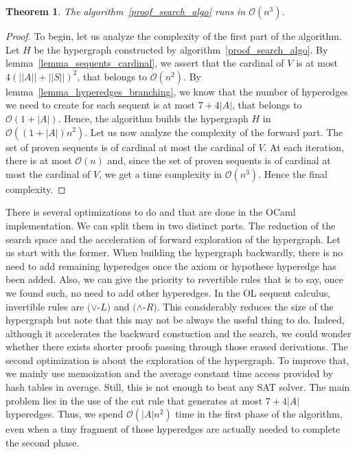 \documentclass[a4paper, 11pt]{article}
\newtheorem{theorem}{Theorem}
\begin{document}
    \begin{theorem}\label{theorem_algo_complexity}
	    The algorithm~\ref{proof_search_algo} runs in $\mathcal{O}(n^3)$.
    \end{theorem}
    \begin{proof}
	    To begin, let us analyze the complexity of the first part of the algorithm. 
	    Let $H$ be the hypergraph constructed by algorithm~\ref{proof_search_algo}. By 
	    lemma~\ref{lemma_sequents_cardinal}, we assert that the cardinal of $V$ is at most 
	    $4(||A||+||S||)^2$, that belongs to $\mathcal{O}(n^2)$. By 
	    lemma~\ref{lemma_hyperedges_branching}, we know that the number
	    of hyperedges we need to create for each sequent is at most $7+4|A|$, that belongs to 
	    $\mathcal{O}(1+|A|)$.
	    Hence, the algorithm builds the hypergraph $H$ in $\mathcal{O}((1+|A|)n^2)$. Let us now 
	    analyze the complexity of the forward part. The set of proven sequents is of cardinal at 
	    most the cardinal of $V$. At each iteration, there is at most $\mathcal{O}(n)$ and, since
	    the set of proven sequents is of cardinal at most the cardinal of $V$, we get a time 
	    complexity in $\mathcal{O}(n^3)$. Hence the final complexity. 
    \end{proof}
    There is several optimizations to do and that are done in the OCaml implementation. We can split
    them in two distinct parts. The reduction of the search space and the acceleration of forward
    exploration of the hypergraph. Let us start with the former. When building the hypergraph backwardly,
    there is no need to add remaining hyperedges once the axiom or hypothese hyperedge has been added.
    Also, we can give the priority to revertible rules that is to say, once we found such, no need
    to add other hyperedges. In the OL sequent calculus, invertible rules are $(\vee$-$L)$ and 
    $(\wedge$-$R)$. This considerably reduces the size of the hypergraph but note that this may not be
    always the useful thing to do. Indeed, although it accelerates the backward constuction and the 
    search, we could wonder whether there exists shorter proofs passing 
    through those erased derivations. The second optimization is about the exploration of the
    hypergraph. To improve that, we mainly use memoization and the average constant time access provided
    by hash tables in average.
    Still, this is not enough to beat any SAT solver. The main problem lies in the use of the cut
    rule that generates at most $7+4|A|$ hyperedges. Thus, we spend $\mathcal{O}(|A|n^2)$ time
    in the first phase of the algorithm, even when a tiny fragment of those hyperedges are actually
    needed to complete the second phase.
\end{document}
